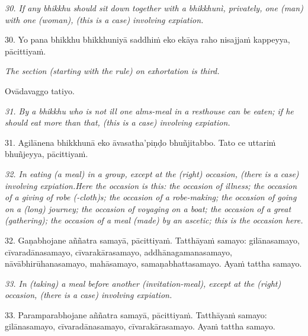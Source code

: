 \documentclass[11pt]{article}
\begin{document}
\begin{paracol}{2}
\begin{column}
{\itshape\footnotesize
30. If any bhikkhu should sit down together with a bhikkhunì, privately, one (man) with one (woman), (this is a case) involving expiation.
}
\switchcolumn

\begin{flushleft}
30. Yo pana bhikkhu bhikkhuniyā saddhiṁ eko ekāya raho nisajjaṁ
kappeyya, pācittiyaṁ.
\switchcolumn*
\end{flushleft}

{\itshape\footnotesize
The section (starting with the rule) on exhortation is third.
}
\switchcolumn

\begin{flushleft}
Ovādavaggo tatiyo.
\switchcolumn*
\end{flushleft}

{\itshape\footnotesize
31. By a bhikkhu who is not ill one alms-meal in a resthouse can be eaten; if he should eat more than that, (this is a case) involving expiation.
}
\switchcolumn

\begin{flushleft}
31. Agilānena bhikkhunā eko āvasatha’piṇḍo bhuñjitabbo. Tato ce uttariṁ bhuñjeyya, pācittiyaṁ.
\switchcolumn*
\end{flushleft}

{\itshape\footnotesize
32. In eating (a meal) in a group, except at the (right) occasion, (there is a case) involving expiation.Here the occasion is this: the occasion of illness; the occasion of a giving of robe (-cloth)s; the occasion of a robe-making; the occasion of going on a (long) journey; the occasion of voyaging on a boat; the occasion of a great (gathering); the occasion of a meal (made) by an ascetic; this is the occasion here.
}
\switchcolumn

\begin{flushleft}
32. Gaṇabhojane aññatra samayā, pācittiyaṁ. Tatthāyaṁ samayo: gilānasamayo, cīvaradānasamayo, cīvarakārasamayo, addhānagamanasamayo, nāvābhirūhanasamayo, mahāsamayo, samaṇabhattasamayo. Ayaṁ tattha samayo.
\switchcolumn*
\end{flushleft}

{\itshape\footnotesize
33. In (taking) a meal before another (invitation-meal), except at the (right) occasion, (there is a case) involving expiation.
}
\switchcolumn

\begin{flushleft}
33. Paramparabhojane aññatra samayā, pācittiyaṁ. Tatthāyaṁ samayo: gilānasamayo, cīvaradānasamayo, cīvarakārasamayo. Ayaṁ tattha samayo.
\switchcolumn*
\end{flushleft}


\end{column}
\end{paracol}
\end{document}

